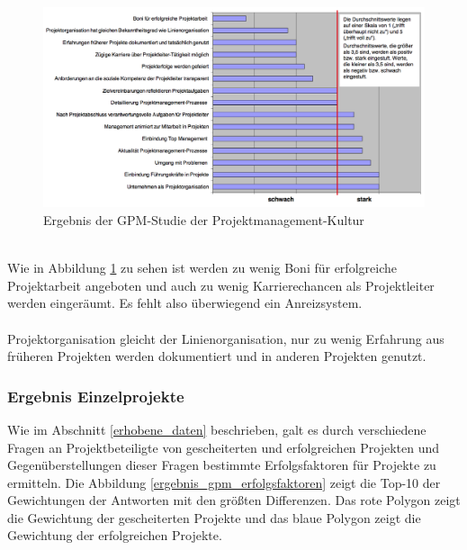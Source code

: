 \documentclass[12pt]{scrartcl}
\begin{document}
\begin{figure}[H]
	\begin{center}
		\includegraphics[width=1.0\textwidth]{img/ergebnis_gpm_studie_kultur}
		\caption{Ergebnis der GPM-Studie der Projektmanagement-Kultur}
		\label{erfgebnis_gpm_studie_pmk}	
	\end{center}
\end{figure}
\ \\
Wie in Abbildung \ref{erfgebnis_gpm_studie_pmk} zu sehen ist werden zu wenig Boni für erfolgreiche Projektarbeit angeboten und auch zu wenig Karrierechancen als Projektleiter werden eingeräumt. Es fehlt also überwiegend ein Anreizsystem.\\
\\ 
Projektorganisation gleicht der Linienorganisation, nur zu wenig Erfahrung aus früheren Projekten werden dokumentiert und in anderen Projekten genutzt.

\subsubsection{Ergebnis Einzelprojekte}
\label{ergebnis_einzel}

Wie im Abschnitt \ref{erhobene_daten} beschrieben, galt es durch verschiedene Fragen an Projektbeteiligte von gescheiterten und erfolgreichen Projekten und Gegenüberstellungen dieser Fragen bestimmte Erfolgsfaktoren für Projekte zu ermitteln. Die Abbildung \ref{ergebnis_gpm_erfolgsfaktoren} zeigt die Top-10 der Gewichtungen der Antworten mit den größten Differenzen. Das rote Polygon zeigt die Gewichtung der gescheiterten Projekte und das blaue Polygon zeigt die Gewichtung der erfolgreichen Projekte. 
\end{document}
